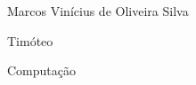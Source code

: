 \documentclass{article}
\begin{document}
Marcos Vinícius de Oliveira Silva

Timóteo

Computação
\end{document}
